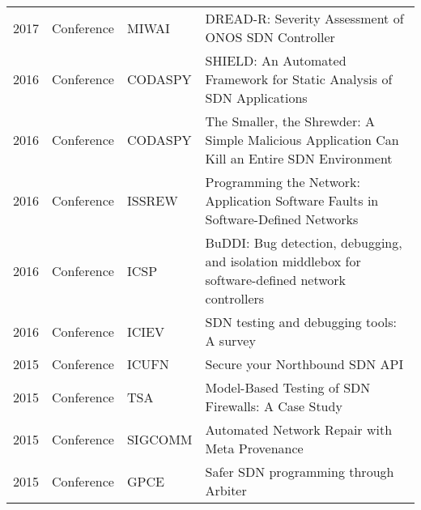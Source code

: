 \begin{appendices}
\begin{table}[ht!]
\begin{adjustbox}{width=\linewidth, center}
\begin{tabular}{llll}
2017          & Conference          & MIWAI                        & DREAD-R: Severity Assessment of ONOS SDN Controller\citep{10.1007/978-3-319-69456-6_27}                                                                                        \\
2016          & Conference          & CODASPY                      & SHIELD: An Automated Framework for Static Analysis of SDN Applications\citep{10.1145/2876019.2876026}                                                                          \\
2016          & Conference          & CODASPY                      & The Smaller, the Shrewder: A Simple Malicious Application Can Kill an Entire SDN Environment\citep{10.1145/2876019.2876024}                                                    \\
2016          & Conference          & ISSREW                       & Programming the Network: Application Software Faults in Software-Defined Networks\citep{7789391}                                                                               \\
2016          & Conference          & ICSP                         & BuDDI: Bug detection, debugging, and isolation middlebox for software-defined network controllers\citep{7818438}                                                               \\
2016          & Conference          & ICIEV                        & SDN testing and debugging tools: A survey\citep{7760078}                                                                                                                       \\
2015          & Conference          & ICUFN                        & Secure your Northbound SDN API\citep{7182679}                                                                                                                                  \\
2015          & Conference          & TSA                          & Model-Based Testing of SDN Firewalls: A Case Study\citep{7335947}                                                                                                              \\
2015          & Conference          & SIGCOMM                          & Automated Network Repair with Meta Provenance\citep{10.1145/2834050.2834112}                                                                                               \\
2015          & Conference          & GPCE                         & Safer SDN programming through Arbiter\citep{10.1145/2936314.2814218}                                                                                                           \\

\end{tabular}
\end{adjustbox}
\end{table}
\end{appendices}
